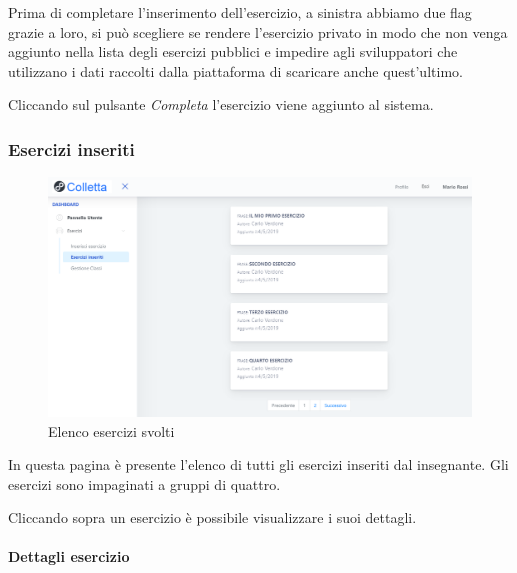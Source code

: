           Prima di completare l'inserimento dell'esercizio, a sinistra abbiamo due flag grazie a loro, si può scegliere se rendere l'esercizio privato in modo che non venga aggiunto  nella lista degli esercizi pubblici e impedire agli sviluppatori che utilizzano i dati raccolti dalla piattaforma di scaricare anche quest'ultimo. 
          
            Cliccando sul pulsante \textit{Completa} l'esercizio viene aggiunto al sistema.
          
\subsubsection{Esercizi inseriti}
\begin{figure}[H]
            	\centering
        		\includegraphics[width=17cm]{sez/img/insegnante/eserinseriti.PNG} 
            	\caption{Elenco esercizi svolti}\label{fig:1}
        	\end{figure}  
        	In questa pagina è presente l'elenco di tutti gli esercizi inseriti dal insegnante. Gli esercizi sono impaginati a gruppi di quattro.
        	
        	 Cliccando sopra un esercizio è possibile visualizzare i suoi dettagli.               
\newpage
\paragraph{Dettagli esercizio}\mbox{}\\   

